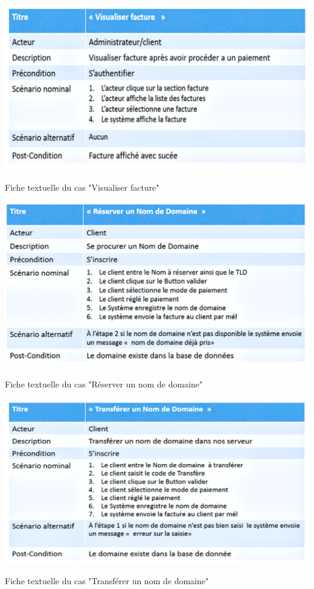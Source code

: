 \documentclass[a4paper, 12pt]{report}
\begin{document}
\begin{table}[H]
	\centering
	\includegraphics{img/fiche/9}
	\caption{Fiche textuelle du cas "Visualiser facture"}
	\label{Tux}
\end{table}
\begin{table}[H]
	\centering
	\includegraphics{img/fiche/10}
	\caption{Fiche textuelle du cas "Réserver un nom de domaine" }
	\label{Tux}
\end{table}
\begin{table}[H]
	\centering
	\includegraphics{img/fiche/11}
	\caption{Fiche textuelle du cas "Transférer un nom de domaine"}
	\label{Tux}
\end{table}
\end{document}
